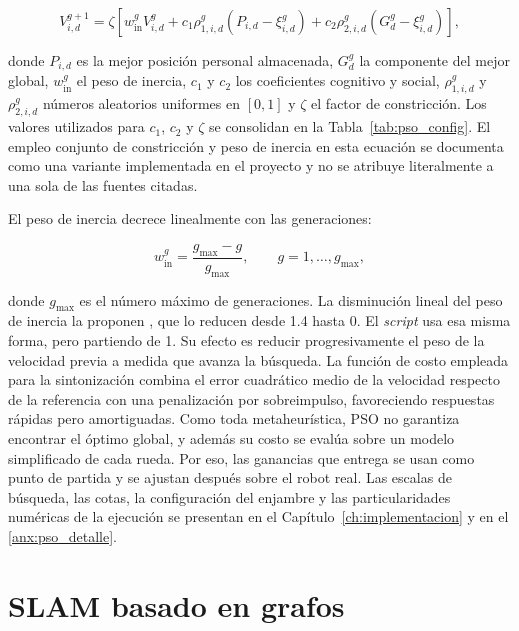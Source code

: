 \begin{equation}
V_{i,d}^{g+1}
=
\zeta
\left[
w_{\mathrm{in}}^{g}V_{i,d}^{g}
+c_1\rho_{1,i,d}^{g}
\left(P_{i,d}-\xi_{i,d}^{g}\right)
+c_2\rho_{2,i,d}^{g}
\left(G_d^{g}-\xi_{i,d}^{g}\right)
\right],
\label{eq:pso_vel_marco_teorico}
\end{equation}

\noindent donde $P_{i,d}$ es la mejor posición personal almacenada,
$G_d^{g}$ la componente del mejor global, $w_{\mathrm{in}}^{g}$ el peso de
inercia, $c_1$ y $c_2$ los coeficientes cognitivo y social,
$\rho_{1,i,d}^{g}$ y $\rho_{2,i,d}^{g}$ números aleatorios uniformes en
$[0,1]$ y $\zeta$ el factor de constricción. Los valores utilizados para
$c_1$, $c_2$ y $\zeta$ se consolidan en la Tabla~\ref{tab:pso_config}. El
empleo conjunto de constricción y peso de inercia en esta ecuación se
documenta como una variante implementada en el proyecto y no se atribuye
literalmente a una sola de las fuentes citadas.

El peso de inercia decrece linealmente con las generaciones:

\begin{equation}
w_{\mathrm{in}}^{g}
=
\frac{g_{\max}-g}{g_{\max}},
\qquad
g=1,\ldots,g_{\max},
\label{eq:pso_inercia}
\end{equation}

\noindent donde $g_{\max}$ es el número máximo de generaciones. La disminución
lineal del peso de inercia la proponen \citet{shi1998modified}, que lo
reducen desde 1.4 hasta 0. El \textit{script} usa esa misma forma, pero partiendo de 1. Su efecto es reducir progresivamente el peso de la
velocidad previa a medida que avanza la búsqueda. La función de costo empleada
para la sintonización combina el error cuadrático medio de la velocidad
respecto de la referencia con una penalización por sobreimpulso, favoreciendo
respuestas rápidas pero amortiguadas. Como toda metaheurística, PSO no
garantiza encontrar el óptimo global, y además su costo se evalúa sobre un
modelo simplificado de cada rueda. Por eso, las ganancias que entrega se usan
como punto de partida y se ajustan después sobre el robot real. Las escalas de
búsqueda, las cotas, la
configuración del enjambre y las particularidades numéricas de la ejecución se
presentan en el Capítulo~\ref{ch:implementacion} y en el
\ref{anx:pso_detalle}.

\section{SLAM basado en grafos}
\label{sec:slam}

